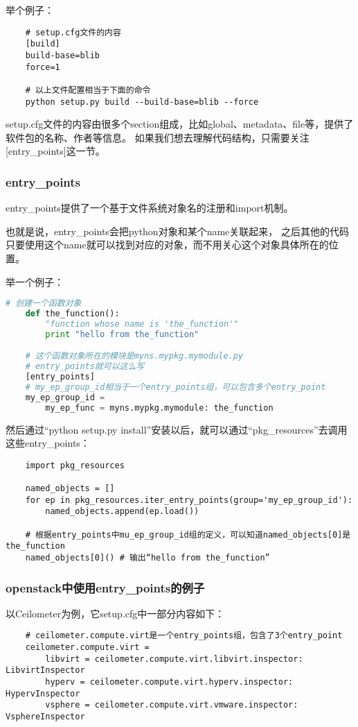 \documentclass[a4paper,left=1.5cm,right=1.5cm,11pt]{article}
\begin{document}
	举个例子：
	\begin{lstlisting}
	# setup.cfg文件的内容
	[build]
	build-base=blib
	force=1

	# 以上文件配置相当于下面的命令
	python setup.py build --build-base=blib --force	
	\end{lstlisting}

	setup.cfg文件的内容由很多个section组成，比如global、metadata、file等，提供了软件包的名称、作者等信息。
	如果我们想去理解代码结构，只需要关注[entry\_points]这一节。

\subsubsection{entry\_points}
	entry\_points提供了一个基于文件系统对象名的注册和import机制。\par

	也就是说，entry\_points会把python对象和某个name关联起来，
	之后其他的代码只要使用这个name就可以找到对应的对象，而不用关心这个对象具体所在的位置。\par

	举一个例子：
	\begin{lstlisting}[language = python]
	# 创建一个函数对象
	def the_function():
		"function whose name is 'the_function'"
		print "hello from the_function"

	# 这个函数对象所在的模块是myns.mypkg.mymodule.py
	# entry_points就可以这么写
	[entry_points]
	# my_ep_group_id相当于一个entry_points组，可以包含多个entry_point
	my_ep_group_id = 
		my_ep_func = myns.mypkg.mymodule: the_function
	\end{lstlisting}

	然后通过“python setup.py install”安装以后，就可以通过“pkg\_resources”去调用这些entry\_points：
	\begin{lstlisting}
	import pkg_resources

	named_objects = []
	for ep in pkg_resources.iter_entry_points(group='my_ep_group_id'):
		named_objects.append(ep.load())

	# 根据entry_points中mu_ep_group_id组的定义，可以知道named_objects[0]是the_function
	named_objects[0]() # 输出“hello from the_function”
	\end{lstlisting}

\subsubsection{openstack中使用entry\_points的例子}
	以Ceilometer为例，它setup.cfg中一部分内容如下：
	\begin{lstlisting}
	# ceilometer.compute.virt是一个entry_points组，包含了3个entry_point
	ceilometer.compute.virt = 
		libvirt = ceilometer.compute.virt.libvirt.inspector: LibvirtInspector
		hyperv = ceilometer.compute.virt.hyperv.inspector: HypervInspector
		vsphere = ceilometer.compute.virt.vmware.inspector: VsphereInspector
	\end{lstlisting}
\end{document}
